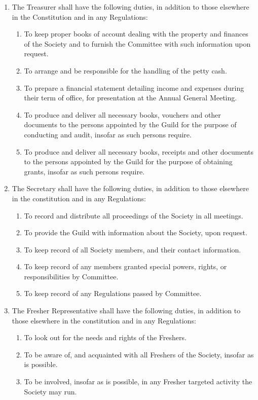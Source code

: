 \documentclass[a4paper]{article}
\begin{document}
\begin{enumerate}
    \item The Treasurer shall have the following duties, in addition to those elsewhere in the Constitution and in any Regulations:
    \begin{enumerate}
        \item To keep proper books of account dealing with the property and finances of the Society and to furnish the Committee with such information upon request.
        \item To arrange and be responsible for the handling of the petty cash.
        \item To prepare a financial statement detailing income and expenses during their term of office, for presentation at the Annual General Meeting.
        \item To produce and deliver all necessary books, vouchers and other documents to the persons appointed by the Guild for the purpose of conducting and audit, insofar as such persons require.
        \item To produce and deliver all necessary books, receipts and other documents to the persons appointed by the Guild for the purpose of obtaining grants, insofar as such persons require.
    \end{enumerate}
    
    \item The Secretary shall have the following duties, in addition to those elsewhere in the constitution and in any Regulations:
    \begin{enumerate}
        \item To record and distribute all proceedings of the Society in all meetings.
        \item To provide the Guild with information about the Society, upon request.
        \item To keep record of all Society members, and their contact information.
        \item To keep record of any members granted special powers, rights, or responsibilities by Committee.
        \item To keep record of any Regulations passed by Committee.
    \end{enumerate}
    
    \item The Fresher Representative shall have the following duties, in addition to those elsewhere in the constitution and in any Regulations:
    \begin{enumerate}
        \item To look out for the needs and rights of the Freshers.
        \item To be aware of, and acquainted with all Freshers of the Society, insofar as is possible.
        \item To be involved, insofar as is possible, in any Fresher targeted activity the Society may run.
    \end{enumerate}
    

\end{enumerate}
\end{document}

